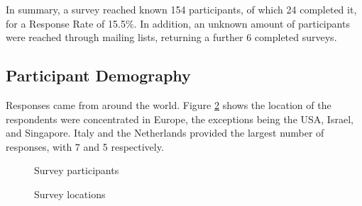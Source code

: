 In summary, a survey reached known 154 participants, of which 24 completed it, for a Response Rate of 15.5\%.
In addition, an unknown amount of participants were reached through mailing lists, returning a further 6 completed surveys.

\subsection{Participant Demography}

Responses came from around the world.
Figure \ref{fig:Survey_locations} shows the location of the respondents were concentrated in Europe, the exceptions being the USA, Israel, and Singapore.
Italy and the Netherlands provided the largest number of responses, with 7 and 5 respectively.

\begin{figure}[H]
    \centering
    \caption{Survey participants}
    \label{fig:Survey_participants}
\end{figure}

\begin{figure}[H]
    \centering
    \caption{Survey locations}
    \label{fig:Survey_locations}
\end{figure}

